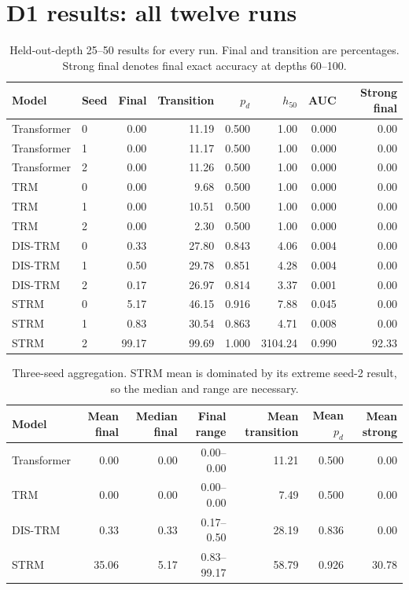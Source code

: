\documentclass[11pt]{article}
\newcommand{\pd}{\ensuremath{p_d}}
\newcommand{\hfive}{\ensuremath{h_{50}}}
\begin{document}
\section{D1 results: all twelve runs}
\begin{table}[ht]
\centering\small
\caption{Held-out-depth 25--50 results for every run. Final and transition are
percentages. Strong final denotes final exact accuracy at depths 60--100.}
\begin{tabular}{llrrrrrr}
\toprule
Model & Seed & Final & Transition & \pd & \hfive & AUC & Strong final\\
\midrule
Transformer & 0 & 0.00 & 11.19 & 0.500 & 1.00 & 0.000 & 0.00\\
Transformer & 1 & 0.00 & 11.17 & 0.500 & 1.00 & 0.000 & 0.00\\
Transformer & 2 & 0.00 & 11.26 & 0.500 & 1.00 & 0.000 & 0.00\\
\midrule
TRM & 0 & 0.00 & 9.68 & 0.500 & 1.00 & 0.000 & 0.00\\
TRM & 1 & 0.00 & 10.51 & 0.500 & 1.00 & 0.000 & 0.00\\
TRM & 2 & 0.00 & 2.30 & 0.500 & 1.00 & 0.000 & 0.00\\
\midrule
DIS-TRM & 0 & 0.33 & 27.80 & 0.843 & 4.06 & 0.004 & 0.00\\
DIS-TRM & 1 & 0.50 & 29.78 & 0.851 & 4.28 & 0.004 & 0.00\\
DIS-TRM & 2 & 0.17 & 26.97 & 0.814 & 3.37 & 0.001 & 0.00\\
\midrule
STRM & 0 & 5.17 & 46.15 & 0.916 & 7.88 & 0.045 & 0.00\\
STRM & 1 & 0.83 & 30.54 & 0.863 & 4.71 & 0.008 & 0.00\\
STRM & 2 & 99.17 & 99.69 & 1.000 & 3104.24 & 0.990 & 92.33\\
\bottomrule
\end{tabular}
\end{table}

\begin{table}[ht]
\centering\small
\caption{Three-seed aggregation. STRM mean is dominated by its extreme
seed-2 result, so the median and range are necessary.}
\begin{tabular}{lrrrrrr}
\toprule
Model & Mean final & Median final & Final range & Mean transition & Mean \pd & Mean strong\\
\midrule
Transformer & 0.00 & 0.00 & 0.00--0.00 & 11.21 & 0.500 & 0.00\\
TRM & 0.00 & 0.00 & 0.00--0.00 & 7.49 & 0.500 & 0.00\\
DIS-TRM & 0.33 & 0.33 & 0.17--0.50 & 28.19 & 0.836 & 0.00\\
STRM & 35.06 & 5.17 & 0.83--99.17 & 58.79 & 0.926 & 30.78\\
\bottomrule
\end{tabular}
\end{table}
\end{document}
